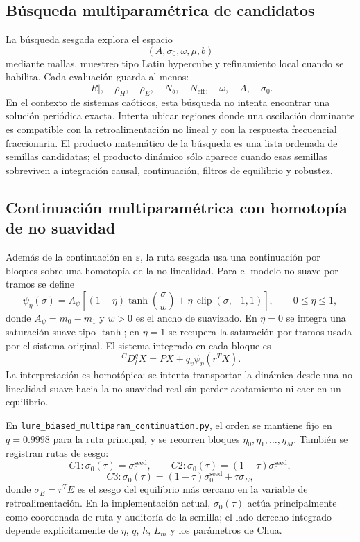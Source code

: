 \documentclass[11pt]{article}
\newcommand{\CaputoD}{\,{}^{C}D_t^q}
\newcommand{\clip}{\operatorname{clip}}
\begin{document}
\subsection{Búsqueda multiparamétrica de candidatos}

La búsqueda sesgada explora el espacio
\[
(A,\sigma_0,\omega,\mu,b)
\]
mediante mallas, muestreo tipo Latin hypercube y refinamiento local cuando se
habilita. Cada evaluación guarda al menos:
\[
|R|,\quad \rho_H,\quad \rho_E,\quad
N_b,\quad N_{\mathrm{eff}},\quad \omega,\quad A,\quad \sigma_0.
\]
En el contexto de sistemas caóticos, esta búsqueda no intenta encontrar una
solución periódica exacta. Intenta ubicar regiones donde una oscilación
dominante es compatible con la retroalimentación no lineal y con la respuesta
frecuencial fraccionaria. El producto matemático de la búsqueda es una lista
ordenada de semillas candidatas; el producto dinámico sólo aparece cuando esas
semillas sobreviven a integración causal, continuación, filtros de equilibrio
y robustez.

\subsection{Continuación multiparamétrica con homotopía de no suavidad}

Además de la continuación en \(\varepsilon\), la ruta sesgada usa una
continuación por bloques sobre una homotopía de la no linealidad. Para el
modelo no suave por tramos se define
\[
\psi_\eta(\sigma)
=A_\psi\left[
(1-\eta)\tanh\left(\frac{\sigma}{w}\right)
+\eta\,\clip(\sigma,-1,1)
\right],
\qquad 0\leq\eta\leq1,
\]
donde \(A_\psi=m_0-m_1\) y \(w>0\) es el ancho de suavizado. En \(\eta=0\) se
integra una saturación suave tipo \(\tanh\); en \(\eta=1\) se recupera la
saturación por tramos usada por el sistema original. El sistema integrado en
cada bloque es
\[
\CaputoD X=P X+q_v\psi_\eta(r^TX).
\]
La interpretación es homotópica: se intenta transportar la dinámica desde una
no linealidad suave hacia la no suavidad real sin perder acotamiento ni caer
en un equilibrio.

En \texttt{lure\_biased\_multiparam\_continuation.py}, el orden se mantiene
fijo en \(q=0.9998\) para la ruta principal, y se recorren bloques
\(\eta_0,\eta_1,\ldots,\eta_M\). También se registran rutas de sesgo:
\[
C1:\sigma_0(\tau)=\sigma_0^{\mathrm{seed}},\qquad
C2:\sigma_0(\tau)=(1-\tau)\sigma_0^{\mathrm{seed}},
\]
\[
C3:\sigma_0(\tau)=
(1-\tau)\sigma_0^{\mathrm{seed}}+\tau\sigma_E,
\]
donde \(\sigma_E=r^TE\) es el sesgo del equilibrio más cercano en la variable
de retroalimentación. En la implementación actual, \(\sigma_0(\tau)\) actúa
principalmente como coordenada de ruta y auditoría de la semilla; el lado
derecho integrado depende explícitamente de \(\eta\), \(q\), \(h\), \(L_m\) y
los parámetros de Chua.
\end{document}
